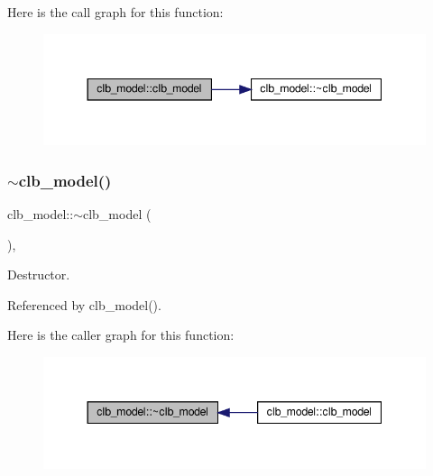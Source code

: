 Here is the call graph for this function\+:
\nopagebreak
\begin{figure}[H]
\begin{center}
\leavevmode
\includegraphics[width=344pt]{d6/d39/classclb__model_a0059d23bad0d3edef661789073b3d0ea_cgraph}
\end{center}
\end{figure}
\mbox{\label{classclb__model_a897a10509fa43b2b61f48c59a0ef880d}} 
\subsubsection{\texorpdfstring{$\sim$clb\+\_\+model()}{~clb\_model()}}
{\footnotesize\ttfamily clb\+\_\+model\+::$\sim$clb\+\_\+model (\begin{DoxyParamCaption}{ }\end{DoxyParamCaption})\hspace{0.3cm}{\ttfamily [override]}, {\ttfamily [default]}}



Destructor. 



Referenced by clb\+\_\+model().

Here is the caller graph for this function\+:
\nopagebreak
\begin{figure}[H]
\begin{center}
\leavevmode
\includegraphics[width=344pt]{d6/d39/classclb__model_a897a10509fa43b2b61f48c59a0ef880d_icgraph}
\end{center}
\end{figure}


